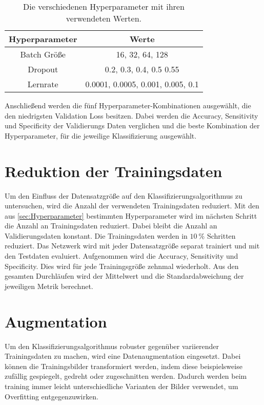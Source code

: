 \begin{table}[htbp]
    \centering
    \begin{tabular}{c c}
        \toprule
        Hyperparameter     & Werte \\
        \midrule
        Batch Größe    & 16, 32, 64, 128   \\
        Dropout        & 0.2, 0.3, 0.4, 0.5 0.55   \\
        Lernrate       & 0.0001, 0.0005, 0.001, 0.005, 0.1   \\
        \bottomrule
  \end{tabular}
  \caption{Die verschiedenen Hyperparameter mit ihren verwendeten Werten.}
  \label{tab:Hypp}
\end{table}
Anschließend werden die fünf Hyperparameter-Kombinationen ausgewählt, die den niedrigsten Validation Loss besitzen.
Dabei werden die Accuracy, Sensitivity und Specificity der Validierungs Daten verglichen und die beste Kombination der Hyperparameter, 
für die jeweilige Klassifizierung ausgewählt.  

\section{Reduktion der Trainingsdaten}\label{sec:Red1}
Um den Einfluss der Datensatzgröße auf den Klassifizierungsalgorithmus zu untersuchen, wird die Anzahl der verwendeten Trainingsdaten reduziert.
Mit den aus \ref{sec:Hyperparameter} bestimmten Hyperparameter wird im nächsten Schritt die Anzahl an Trainingsdaten reduziert.
Dabei bleibt die Anzahl an Validierungsdaten konstant.
Die Trainingsdaten werden in $\qty{10}{\%}$ Schritten reduziert. 
Das Netzwerk wird mit jeder Datensatzgröße separat trainiert und mit den Testdaten evaluiert. 
Aufgenommen wird die Accuracy, Sensitivity und Specificity.
Dies wird für jede Trainingsgröße zehnmal wiederholt.
Aus den gesamten Durchläufen wird der Mittelwert und die Standardabweichung der jeweiligen Metrik berechnet.

\section{Augmentation}
Um den Klassifizierungsalgorithmus robuster gegenüber variierender Trainingsdaten zu machen, wird eine Datenaugmentation eingesetzt.
Dabei können die Trainingsbilder transformiert werden, indem diese beispielsweise zufällig gespiegelt, gedreht oder zugeschnitten werden. 
Dadurch werden beim training immer leicht unterschiedliche Varianten der Bilder verwendet, um Overfitting entgegenzuwirken.~\cite{Yamashita2018}

